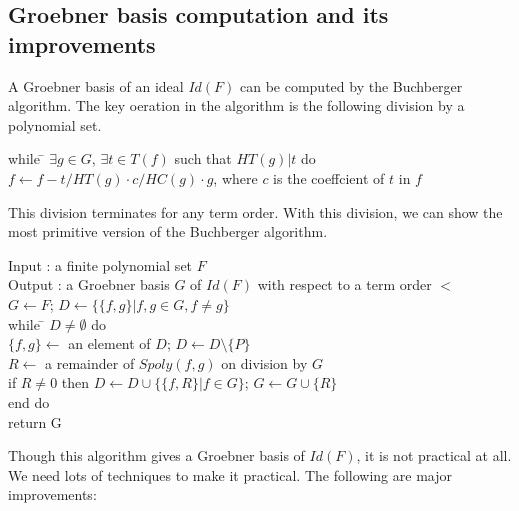 \documentclass[runningheads]{cl2emult}
\begin{document}
\subsection{Groebner basis computation and its improvements}

A Groebner basis of an ideal $Id(F)$ can be computed by the Buchberger
algorithm. The key oeration in the algorithm is the following 
division by a polynomial set.
\begin{tabbing}
while \= $\exists g \in G$, $\exists t \in T(f)$ such that $HT(g)|t$ do\\
      \> $f \leftarrow f - t/HT(g) \cdot c/HC(g) \cdot g$, \quad
      where $c$ is the coeffcient of $t$ in $f$
\end{tabbing}
This division terminates for any term order.
With this division, we can show the most primitive version of the
Buchberger algorithm.
\begin{tabbing}
Input : a finite polynomial set $F$\\
Output : a Groebner basis $G$ of $Id(F)$ with respect to a term order $<$\\
$G \leftarrow F$; \quad $D \leftarrow \{\{f,g\}| f, g \in G, f \neq g \}$\\
while \= $D \neq \emptyset$ do \\
      \> $\{f,g\} \leftarrow$ an element of $D$; \quad
          $D \leftarrow D \setminus \{P\}$\\
      \> $R \leftarrow$ a remainder of $Spoly(f,g)$ on division by $G$\\
      \> if $R \neq 0$ then $D \leftarrow D \cup \{\{f,R\}| f \in G\}$; \quad
         $G \leftarrow G \cup \{R\}$\\
end do\\
return G
\end{tabbing}
Though this algorithm gives a Groebner basis of $Id(F)$, 
it is not practical at all. We need lots of techniques to make
it practical. The following are major improvements:
\end{document}
